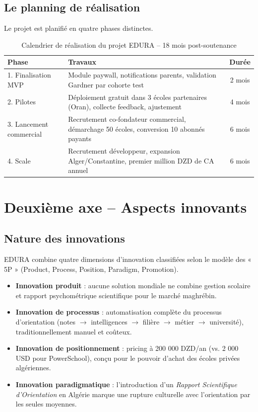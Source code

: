 \documentclass[12pt,a4paper,oneside]{report}
\begin{document}
\subsection{Le planning de réalisation}

Le projet est planifié en quatre phases distinctes.

\begin{table}[H]
\centering
\caption{Calendrier de réalisation du projet EDURA -- 18 mois post-soutenance}
\label{tab:planning}
\begin{tabularx}{\textwidth}{lXc}
\toprule
\textbf{Phase} & \textbf{Travaux} & \textbf{Durée} \\
\midrule
1. Finalisation MVP & Module paywall, notifications parents, validation Gardner par cohorte test & 2 mois \\
2. Pilotes & Déploiement gratuit dans 3 écoles partenaires (Oran), collecte feedback, ajustement & 4 mois \\
3. Lancement commercial & Recrutement co-fondateur commercial, démarchage 50 écoles, conversion 10 abonnés payants & 6 mois \\
4. Scale & Recrutement développeur, expansion Alger/Constantine, premier million DZD de CA annuel & 6 mois \\
\bottomrule
\end{tabularx}
\end{table}

\section{Deuxième axe -- Aspects innovants}

\subsection{Nature des innovations}

EDURA combine quatre dimensions d'innovation classifiées selon le modèle des « 5P » (Product, Process, Position, Paradigm, Promotion).

\begin{itemize}
  \item \textbf{Innovation produit} : aucune solution mondiale ne combine gestion scolaire et rapport psychométrique scientifique pour le marché maghrébin.
  \item \textbf{Innovation de processus} : automatisation complète du processus d'orientation (notes $\to$ intelligences $\to$ filière $\to$ métier $\to$ université), traditionnellement manuel et coûteux.
  \item \textbf{Innovation de positionnement} : pricing à 200 000 DZD/an (vs. 2 000 USD pour PowerSchool), conçu pour le pouvoir d'achat des écoles privées algériennes.
  \item \textbf{Innovation paradigmatique} : l'introduction d'un \textit{Rapport Scientifique d'Orientation} en Algérie marque une rupture culturelle avec l'orientation par les seules moyennes.
\end{itemize}
\end{document}
